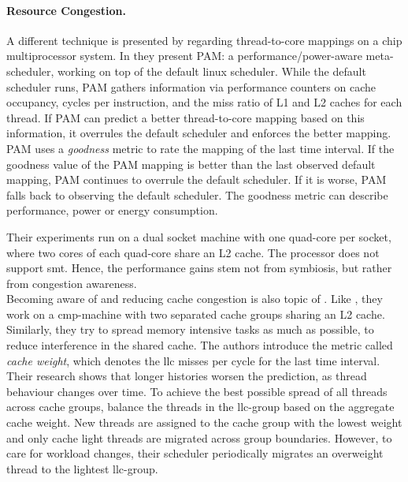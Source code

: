 \paragraph{Resource Congestion.}
A different technique is presented by \citeauthor{banikazemi_pam_2008}
regarding thread-to-core mappings on a chip multiprocessor system.
In \cite{banikazemi_pam_2008} they present PAM: a performance/power-aware
meta-scheduler, working on top of the default linux scheduler.
While the default scheduler runs, PAM gathers information via performance
counters on cache occupancy, cycles per instruction, and the miss ratio of L1
and L2 caches for each thread.
If PAM can predict a better thread-to-core mapping based on this information,
it overrules the default scheduler and enforces the better mapping.
PAM uses a \emph{goodness} metric to rate the mapping of the last time interval.
If the goodness value of the PAM mapping is better than the last observed
default mapping, PAM continues to overrule the default scheduler.
If it is worse, PAM falls back to observing the default scheduler.
The goodness metric can describe performance, power or energy consumption.

Their experiments run on a dual socket machine with one quad-core per socket,
where two cores of each quad-core share an L2 cache.
The processor does not support \gls{smt}.
Hence, the performance gains stem not from symbiosis, but rather from
congestion awareness.
\\

Becoming aware of and reducing cache congestion is also topic of
\cite{knauerhase_using_2008}.
Like \citeauthor{banikazemi_pam_2008}, they work on a \gls{cmp}-machine with
two separated cache groups sharing an L2 cache.
Similarly, they try to spread memory intensive tasks as much as possible,
to reduce interference in the shared cache.
The authors introduce the metric called \emph{cache weight}, which denotes the
\gls{llc} misses per cycle for the last time interval.
Their research shows that longer histories worsen the prediction, as thread
behaviour changes over time.
To achieve the best possible spread of all threads across cache groups,
\citeauthor{knauerhase_using_2008} balance the threads in the \gls{llc}-group
based on the aggregate cache weight.
New threads are assigned to the cache group with the lowest weight and only
cache light threads are migrated across group boundaries.
However, to care for workload changes, their scheduler periodically migrates an
overweight thread to the lightest \gls{llc}-group.

